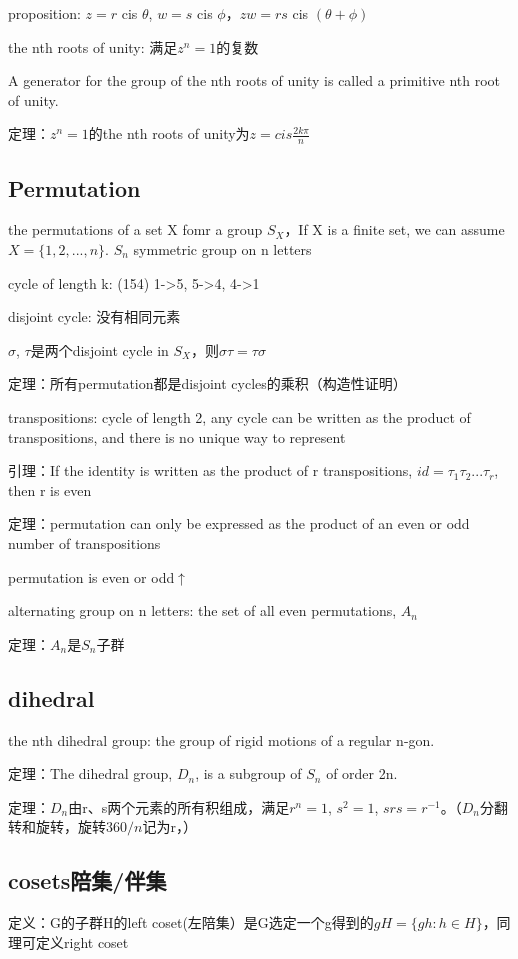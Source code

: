 \documentclass[cn,hazy,blue,screen,14pt]{note}
\begin{document}
proposition: $z=r$ cis $\theta$, $w=s$ cis $\phi$，$zw=rs$ cis $(\theta+\phi)$

the nth roots of unity: 满足$z^{n}=1$的复数

A generator for the group of the nth roots of unity is called a primitive nth root of unity.

定理：$z^{n}=1$的the nth roots of unity为$z=cis \frac{2k\pi}{n}$

\subsection{Permutation}
the permutations of a set X fomr a group $S_{X}$，If X is a finite set, we can assume $X=\{1, 2, ... ,n\}$. $S_{n}$ symmetric group on n letters

cycle of length k: (154) 1->5, 5->4, 4->1

disjoint cycle: 没有相同元素

$\sigma$, $\tau$是两个disjoint cycle in $S_{X}$，则$\sigma\tau=\tau\sigma$

定理：所有permutation都是disjoint cycles的乘积（构造性证明）

transpositions: cycle of length 2, any cycle can be written as the product of transpositions, and there is no unique way to represent

引理：If the identity is written as the product of r transpositions, $id=\tau_1\tau_2...\tau_{r}$, then r is even

定理：permutation can only be expressed as the product of an even or odd number of transpositions

permutation is even or odd$\uparrow$

alternating group on n letters: the set of all even permutations, $A_{n}$

定理：$A_{n}$是$S_{n}$子群

\subsection{dihedral}
the nth dihedral group: the group of rigid motions of a regular n-gon.

定理：The dihedral group, $D_{n}$, is a subgroup of $S_{n}$ of order 2n.

定理：$D_{n}$由r、s两个元素的所有积组成，满足$r^{n}=1$, $s^{2}=1$, $srs=r^{-1}$。（$D_{n}$分翻转和旋转，旋转$360/n$记为r，）

\subsection{cosets陪集/伴集}
定义：G的子群H的left coset(左陪集）是G选定一个g得到的$gH=\{gh:h\in H\}$，同理可定义right coset
\end{document}
